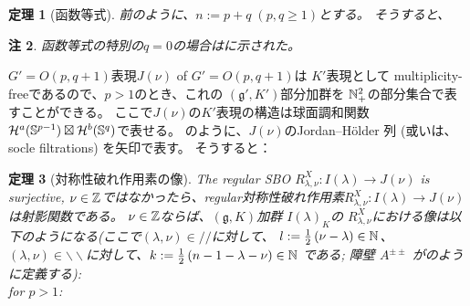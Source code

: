 \documentclass[12pt]{article} %
\newtheorem{theorem}{定理}
\newtheorem{remark}[theorem]{注}
\theoremstyle{definition}
\theoremstyle{exampstyle} \newtheorem{examp}[theorem]{Theorem}
\begin{document}
	\begin{theorem}[函数等式]
	前のように、$n:=p+q\;(p,q\ge1)$とする。
	そうすると、
	\end{theorem}
	\begin{remark}
		函数等式の特別の$q=0$の場合は\cite[Thm. 12.6]{kobayashi2015program}に示された。
	\end{remark}
	$G'=O(p,q+1)$表現$J(\nu)$ of $G'=O(p,q+1)$は $K'$表現として multiplicity-freeであるので、$p>1$のとき、これの $(\mathfrak{g}',K')$部分加群を $\mathbb{N}_{+}^2$の部分集合で表すことができる。
	ここで$J(\nu)$の$K'$表現の構造は球面調和関数
	$\mathcal{H}^a(\mathbb{S}^{p-1})\boxtimes\mathcal{H}^b(\mathbb{S}^q)$で表せる。
 	\cite{howe1993homogeneous}のように、$J(\nu)$のJordan--H\"older 列 (或いは、socle filtrations) を矢印で表す。
	そうすると：
\begin{theorem}[対称性破れ作用素の像]
	The regular SBO $R_{\lambda,\nu}^X:I(\lambda)\to J(\nu)$ is surjective,
	$\nu\in\mathbb{Z}$ではなかったら、regular対称性破れ作用素$R_{\lambda,\nu}^X:I(\lambda)\to J(\nu)$は射影関数である。
	$\nu\in\mathbb{Z}$ならば、$(\mathfrak{g},K)$加群 $I(\lambda)_K$の
	$R_{\lambda,\nu}^X$における像は以下のようになる(ここで$(\lambda,\nu)\in//$に対して、
	$l:=\frac{1}{2}\left( \nu-\lambda \right)\in\mathbb{N}$、$(\lambda,\nu)\in\backslash\backslash$に対して、$k:=\frac{1}{2}\left( n-1-\lambda-\nu \right)
	\in\mathbb{N}$ である; 障壁 $A^{\pm\pm}$
	が\cite{howe1993homogeneous}のように定義する): \\
	for $p>1$:
\end{theorem}
\end{document}
